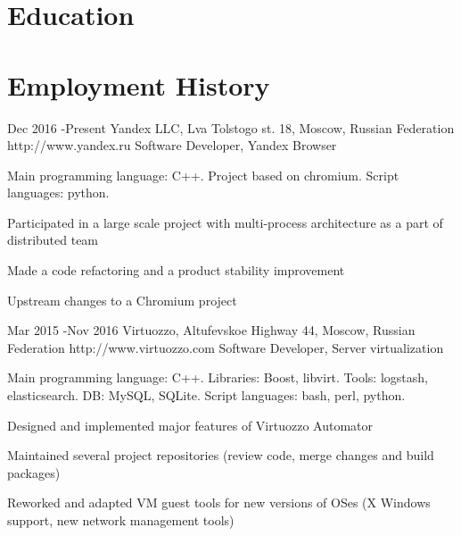 \documentclass[10pt]{article} %
\begin{document}
\section{Education}



\section{Employment History}

\job
{Dec 2016 -}{Present}
{Yandex LLC, Lva Tolstogo st. 18, Moscow, Russian Federation}
{http://www.yandex.ru}
{Software Developer, Yandex Browser}
{
Main programming language: C++. Project based on chromium. Script languages: python.
\begin{itemize-noindent}
\setlength\itemsep{0em}
\item{Participated in a large scale project with multi-process architecture as a part of distributed team}
\item{Made a code refactoring and a product stability improvement}
\item{Upstream changes to a Chromium project}
\end{itemize-noindent}
}


\job
{Mar 2015 -}{Nov 2016}
{Virtuozzo, Altufevskoe Highway 44, Moscow, Russian Federation}
{http://www.virtuozzo.com}
{Software Developer, Server virtualization}
{
Main programming language: C++. Libraries: Boost, libvirt. Tools: logstash, elasticsearch. DB: MySQL, SQLite. Script languages: bash, perl, python.
\begin{itemize-noindent}
\setlength\itemsep{0em}
\item{Designed and implemented major features of Virtuozzo Automator}
\item{Maintained several project repositories (review code, merge changes and build packages)}
\item{Reworked and adapted VM guest tools for new versions of OSes (X Windows support, new network management tools)}
\end{itemize-noindent}
}
\end{document}
